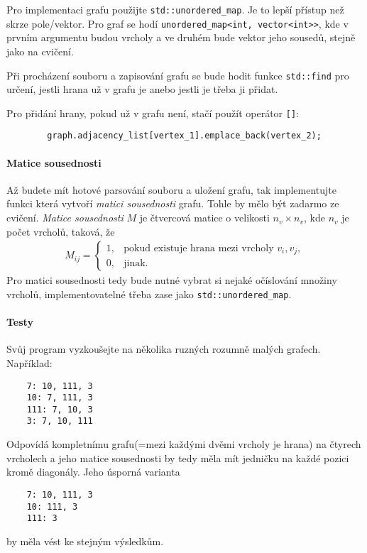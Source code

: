 \documentclass[12pt,oneside]{article}
\begin{document}
	Pro implementaci grafu použijte \verb|std::unordered_map|. Je to lepší přístup než skrze pole/vektor.
	Pro graf se hodí \verb|unordered_map<int, vector<int>>|, kde v prvním argumentu budou vrcholy a ve druhém bude vektor jeho sousedů, stejně jako na cvičení.
	
	Při procházení souboru a zapisování grafu se bude hodit funkce \verb*|std::find| pro určení, jestli hrana už v grafu je anebo jestli je třeba ji přidat.
	
	Pro přidání hrany, pokud už v grafu není, stačí použít operátor \verb*|[]|:
	\begin{verbatim}
		graph.adjacency_list[vertex_1].emplace_back(vertex_2);
	\end{verbatim}
	
	\paragraph{Matice sousednosti}
	Až budete mít hotové parsování souboru a uložení grafu, tak implementujte funkci která vytvoří \textit{matici sousednosti} grafu.
	Tohle by mělo být zadarmo ze cvičení.
	\textit{Matice sousednosti} $M$ je čtvercová matice o velikosti $n_v \times n_v$, kde $n_v$ je počet vrcholů, taková, že
	\begin{align}
		M_{ij} =  \begin{cases}
			1, & \text{pokud existuje hrana mezi vrcholy $v_i, v_j$}, \\
			0, & \text{jinak}.
		\end{cases}
	\end{align}
	Pro matici sousednosti tedy bude nutné vybrat si nejaké očíslování množiny vrcholů, implementovatelné třeba zase jako \verb|std::unordered_map|.
	
	
	\paragraph{Testy}
	Svůj program vyzkoušejte na několika ruzných rozumně malých grafech.
	Například:
	\begin{verbatim}
	7: 10, 111, 3
	10: 7, 111, 3
	111: 7, 10, 3
	3: 7, 10, 111
	\end{verbatim}
	Odpovídá kompletnímu grafu(=mezi každými dvěmi vrcholy je hrana) na čtyrech vrcholech a jeho matice sousednosti by tedy měla mít jedničku na každé pozici kromě diagonály.
	Jeho úsporná varianta
	\begin{verbatim}
	7: 10, 111, 3
	10: 111, 3
	111: 3
	\end{verbatim}
	by měla vést ke stejným výsledkům.
	
\end{document}

